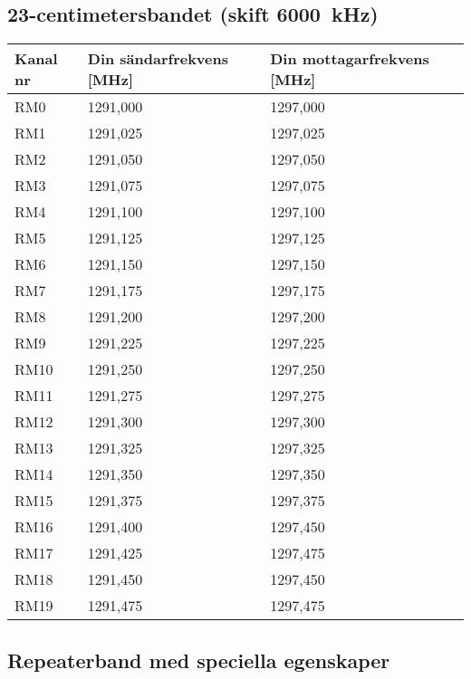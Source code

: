 \subsection{23-centimetersbandet (skift 6000~kHz)}
\begin{tabular}{ l | l | l }
  Kanal nr & Din sändarfrekvens [MHz] & Din mottagarfrekvens [MHz] \\
  \hline
  RM0 & 1291,000 & 1297,000 \\
  RM1 & 1291,025 & 1297,025 \\
  RM2 & 1291,050 & 1297,050 \\
  RM3 & 1291,075 & 1297,075 \\
  RM4 & 1291,100 & 1297,100 \\
  RM5 & 1291,125 & 1297,125 \\
  RM6 & 1291,150 & 1297,150 \\
  RM7 & 1291,175 & 1297,175 \\
  RM8 & 1291,200 & 1297,200 \\
  RM9 & 1291,225 & 1297,225 \\
  RM10 & 1291,250 & 1297,250 \\
  RM11 & 1291,275 & 1297,275 \\
  RM12 & 1291,300 & 1297,300 \\
  RM13 & 1291,325 & 1297,325 \\
  RM14 & 1291,350 & 1297,350 \\
  RM15 & 1291,375 & 1297,375 \\
  RM16 & 1291,400 & 1297,450 \\
  RM17 & 1291,425 & 1297,475 \\
  RM18 & 1291,450 & 1297,450 \\
  RM19 & 1291,475 & 1297,475 \\
\end{tabular}

\subsection{Repeaterband med speciella egenskaper}


